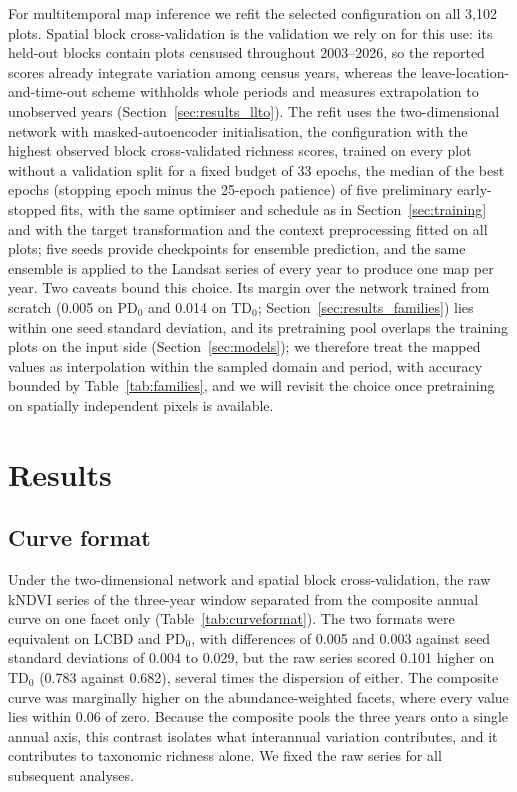 \documentclass[preprint,12pt]{elsarticle}
\begin{document}
For multitemporal map inference we refit the selected configuration on all 3,102 plots.
Spatial block cross-validation is the validation we rely on for this use: its held-out
blocks contain plots censused throughout 2003--2026, so the reported scores already
integrate variation among census years, whereas the leave-location-and-time-out scheme
withholds whole periods and measures extrapolation to unobserved years
(Section~\ref{sec:results_llto}). The refit uses the two-dimensional network with
masked-autoencoder initialisation, the configuration with the highest observed block
cross-validated richness scores, trained on every plot without a validation split for a
fixed budget of 33 epochs, the median of the best epochs (stopping epoch minus the 25-epoch
patience) of five preliminary early-stopped fits, with the same optimiser and schedule as
in Section~\ref{sec:training} and with the target transformation and the context
preprocessing fitted on all plots; five seeds provide checkpoints for ensemble prediction,
and the same ensemble is applied to the Landsat series of every year to produce one map
per year.
Two caveats bound this choice. Its margin over the network trained from scratch (0.005 on
PD$_0$ and 0.014 on TD$_0$; Section~\ref{sec:results_families}) lies within one seed
standard deviation, and its pretraining pool overlaps the training plots on the input side
(Section~\ref{sec:models}); we therefore treat the mapped values as interpolation within
the sampled domain and period, with accuracy bounded by Table~\ref{tab:families}, and we
will revisit the choice once pretraining on spatially independent pixels is available.

\section{Results}

\subsection{Curve format}
\label{sec:results_curves}

Under the two-dimensional network and spatial block cross-validation, the raw kNDVI series
of the three-year window separated from the composite annual curve on one facet only
(Table~\ref{tab:curveformat}). The two formats were equivalent on LCBD and PD$_0$, with
differences of 0.005 and 0.003 against seed standard deviations of 0.004 to 0.029, but the
raw series scored 0.101 higher on TD$_0$ (0.783 against 0.682), several times the
dispersion of either. The composite curve was marginally higher on the abundance-weighted
facets, where every value lies within 0.06 of zero. Because the composite pools the three
years onto a single annual axis, this contrast isolates what interannual variation
contributes, and it contributes to taxonomic richness alone. We fixed the raw series for
all subsequent analyses.
\end{document}
